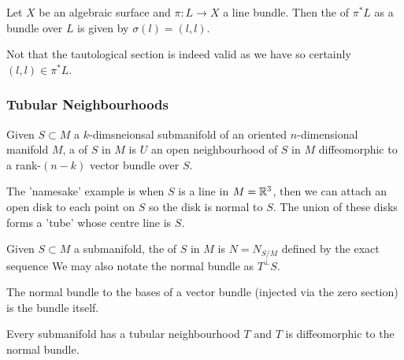 \documentclass{article}
\begin{document}
\begin{definition}
	Let $X$ be an algebraic surface and $\pi:L \to X$ a line bundle. Then the  of $\pi^\ast L$ as a bundle over $L$ is given by $\sigma(l) = (l,l)$. 
\end{definition}

\begin{remark}
	Not that the tautological section is indeed valid as we have 
	so certainly $(l,l) \in \pi^\ast L$. 
\end{remark}

\subsubsection{Tubular Neighbourhoods}

\begin{definition}
	Given $S \subset M$ a $k$-dimsneionsal submanifold of an oriented $n$-dimensional manifold $M$, a  of $S$ in $M$ is $U$ an open neighbourhood of $S$ in $M$ diffeomorphic to a rank-$(n-k)$ vector bundle over $S$. 
\end{definition}

\begin{example}
	The 'namesake' example is when $S$ is a line in $M=\mathbb{R}^3$, then we can attach an open disk to each point on $S$ so the disk is normal to $S$. The union of these disks forms a 'tube' whose centre line is $S$. 
\end{example}

\begin{definition}
	Given $S \subset M$ a submanifold, the  of $S$ in $M$ is $N = N_{S/M}$ defined by the exact sequence 
	We may also notate the normal bundle as $T^\perp S$.
\end{definition}

\begin{example}
	The normal bundle to the bases of a vector bundle (injected via the zero section) is the bundle itself.
\end{example}

\begin{theorem}
	Every submanifold has a tubular neighbourhood $T$ and $T$ is diffeomorphic to the normal bundle. 
\end{theorem}
\end{document}
